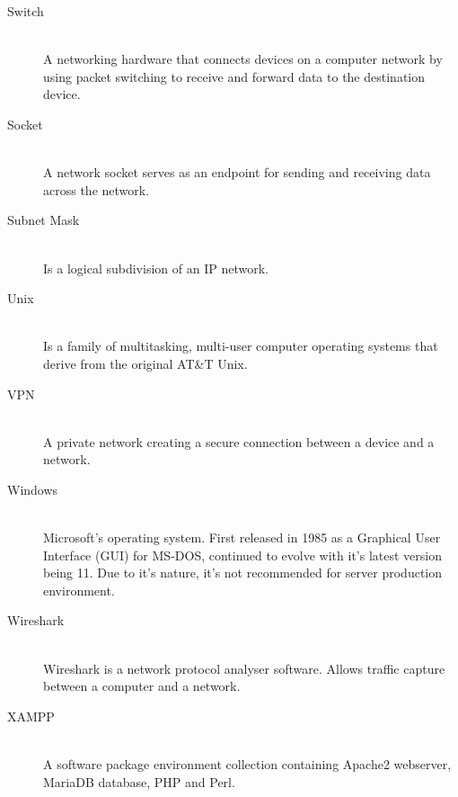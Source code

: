 \documentclass[11pt,a4paper]{report}
\begin{document}
\begin{description}
        \item[Switch] \hfill \\
            A networking hardware that connects devices on a computer network by using packet switching to receive and forward data to the destination device.
        \item[Socket] \hfill \\
            A network socket serves as an endpoint for sending and receiving data across the network.
        \item[Subnet Mask] \hfill \\
            Is a logical subdivision of an IP network.
        \item[Unix] \hfill \\
            Is a family of multitasking, multi-user computer operating systems that derive from the original AT\&T Unix.
        \item[VPN] \hfill \\
            A private network creating a secure connection between a device and a network.
        \item[Windows] \hfill \\
            Microsoft's operating system. First released in 1985 as a Graphical User Interface (GUI) for MS-DOS, continued to evolve with it's latest version being 11.
            Due to it's nature, it's not recommended for server production environment.
        \item[Wireshark] \hfill \\
            Wireshark is a network protocol analyser software. Allows traffic capture between a computer and a network.
        \item[XAMPP] \hfill \\
            A software package environment collection containing Apache2 webserver, MariaDB database, PHP and Perl.
    \end{description}

\end{document}
